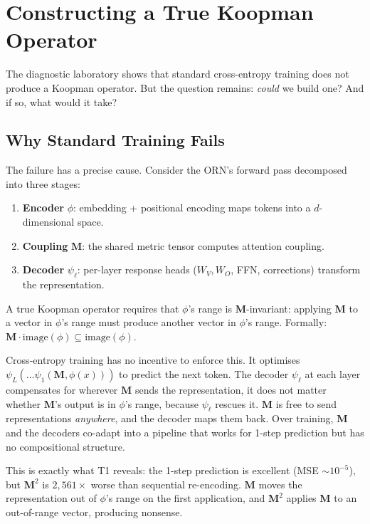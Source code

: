 \documentclass[11pt, a4paper]{article}
\newcommand{\M}{\mathbf{M}}
\theoremstyle{plain}
\theoremstyle{remark}
\begin{document}
\section{Constructing a True Koopman Operator}\label{sec:constructing-koopman}

The diagnostic laboratory shows that standard cross-entropy training does not produce a Koopman operator.
But the question remains: \emph{could} we build one?
And if so, what would it take?

\subsection{Why Standard Training Fails}

The failure has a precise cause.
Consider the ORN's forward pass decomposed into three stages:
\begin{enumerate}[nosep]
    \item \textbf{Encoder} $\phi$: embedding + positional encoding maps tokens into a $d$-dimensional space.
    \item \textbf{Coupling} $\M$: the shared metric tensor computes attention coupling.
    \item \textbf{Decoder} $\psi_\ell$: per-layer response heads ($W_V, W_O$, FFN, corrections) transform the representation.
\end{enumerate}

A true Koopman operator requires that $\phi$'s range is $\M$-invariant: applying $\M$ to a vector in $\phi$'s range must produce another vector in $\phi$'s range.
Formally: $\M \cdot \text{image}(\phi) \subseteq \text{image}(\phi)$.

Cross-entropy training has no incentive to enforce this.
It optimises $\psi_L(\ldots \psi_1(\M, \phi(x)))$ to predict the next token.
The decoder $\psi_\ell$ at each layer compensates for wherever $\M$ sends the representation, it does not matter whether $\M$'s output is in $\phi$'s range, because $\psi_\ell$ rescues it.
$\M$ is free to send representations \emph{anywhere}, and the decoder maps them back.
Over training, $\M$ and the decoders co-adapt into a pipeline that works for 1-step prediction but has no compositional structure.

This is exactly what T1 reveals: the 1-step prediction is excellent (MSE $\sim 10^{-5}$), but $\M^2$ is $2{,}561\times$ worse than sequential re-encoding.
$\M$ moves the representation out of $\phi$'s range on the first application, and $\M^2$ applies $\M$ to an out-of-range vector, producing nonsense.
\end{document}
